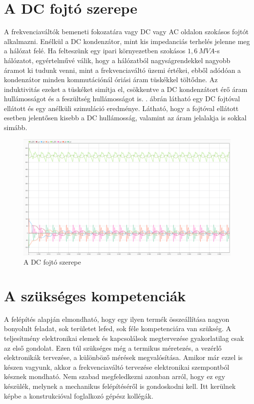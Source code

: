 \section{A DC fojtó szerepe}

A frekvenciaváltók bemeneti fokozatára vagy DC vagy AC oldalon szokásos fojtót alkalmazni. Enélkül a DC kondenzátor, mint kis impedanciás terhelés jelenne meg a hálózat felé. Ha felteszünk egy ipari környezetben szokásos $1,6\ MVA$-s hálózatot, egyértelművé válik, hogy a hálózatból nagyságrendekkel nagyobb áramot ki tudunk venni, mint a frekvenciaváltó üzemi értékei, ebből adódóan a kondenzátor minden kommutációnál óriási áram tüskékkel töltődne. Az induktivitás ezeket a tüskéket simítja el, csökkentve a DC kondenzátort érő áram hullámosságot és a feszültség hullámosságot is. . ábrán látható egy DC fojtóval ellátott és egy anélküli szimuláció eredménye. Látható, hogy a fojtóval ellátott esetben jelentősen kisebb a DC hullámosság, valamint az áram jelalakja is sokkal simább.

\begin{figure}[H!]
	\centering
	\includegraphics[width = \textwidth]{figures/choke_vs_nochoke_11A.png}
	\caption{A DC fojtó szerepe} 
	\label{fig:chokenochoke}
\end{figure}



\section{A szükséges kompetenciák}

A felépítés alapján elmondható, hogy egy ilyen termék összeállítása nagyon bonyolult feladat, sok területet lefed, sok féle kompetenciára van szükség. A teljesítmény elektronikai elemek és kapcsolálsok megtervezése gyakorlatilag csak az első gondolat. Ezen túl szükséges még a termikus méretezés, a vezérlő elektronikák tervezése, a különböző mérések megvalósítása. Amikor már ezzel is készen vagyunk, akkor a frekvenciaváltó tervezése elektronikai szempontból késznek mondható. Nem szabad megfeledkezni azonban arról, hogy ez egy készülék, melynek a mechanikus felépítéséről is gondoskodni kell. Itt kerülnek képbe a konstrukcióval foglalkozó gépész kollégák.

